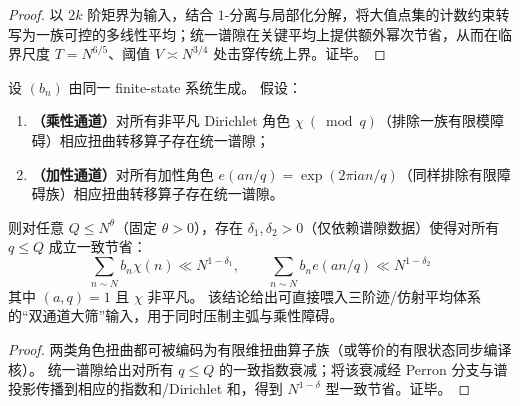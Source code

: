\begin{proof}
以 \(2k\) 阶矩界为输入，结合 \(1\)-分离与局部化分解，将大值点集的计数约束转写为一族可控的多线性平均；统一谱隙在关键平均上提供额外幂次节省，从而在临界尺度 \(T=N^{6/5}\)、阈值 \(V\asymp N^{3/4}\) 处击穿传统上界。证毕。
\end{proof}

\begin{proposition}\label{prop:conclusion74-double-large-sieve-input}
设 \((b_n)\) 由同一 finite-state 系统生成。
假设：
\begin{enumerate}
  \item \textbf{（乘性通道）}对所有非平凡 Dirichlet 角色 \(\chi\ (\bmod q)\)（排除一族有限模障碍）相应扭曲转移算子存在统一谱隙；
  \item \textbf{（加性通道）}对所有加性角色 \(e(an/q)=\exp(2\pi\mathrm{i}an/q)\)（同样排除有限障碍族）相应扭曲转移算子存在统一谱隙。
\end{enumerate}
则对任意 \(Q\le N^\theta\)（固定 \(\theta>0\)），存在 \(\delta_1,\delta_2>0\)（仅依赖谱隙数据）使得对所有 \(q\le Q\) 成立一致节省：
\[
\boxed{\;
\sum_{n\sim N} b_n\chi(n)\ll N^{1-\delta_1},\qquad
\sum_{n\sim N} b_n e(an/q)\ll N^{1-\delta_2}\;}
\]
其中 \((a,q)=1\) 且 \(\chi\) 非平凡。
该结论给出可直接喂入三阶迹/仿射平均体系的“双通道大筛”输入，用于同时压制主弧与乘性障碍。
\end{proposition}

\begin{proof}
两类角色扭曲都可被编码为有限维扭曲算子族（或等价的有限状态同步编译核）。
统一谱隙给出对所有 \(q\le Q\) 的一致指数衰减；将该衰减经 Perron 分支与谱投影传播到相应的指数和/Dirichlet 和，得到 \(N^{1-\delta}\) 型一致节省。证毕。
\end{proof}

\endinput
